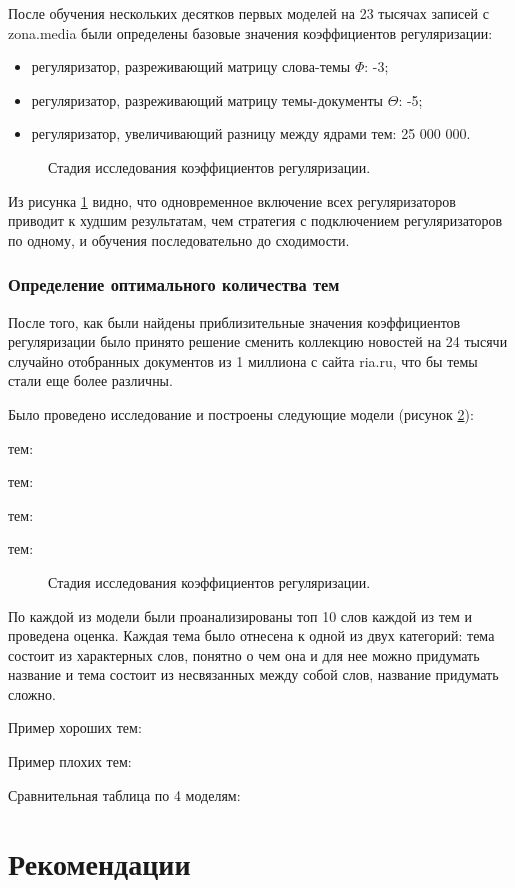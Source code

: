 После обучения нескольких десятков первых моделей на 23 тысячах записей с zona.media были определены базовые значения коэффициентов регуляризации:

\begin{itemize}
    \item регуляризатор, разреживающий матрицу слова-темы $\Phi$: -3;
    \item регуляризатор, разреживающий матрицу темы-документы $\Theta$: -5;
    \item регуляризатор, увеличивающий разницу между ядрами тем: 25 000 000.
\end{itemize}

\begin{figure}[h]
    \caption{Стадия исследования коэффициентов регуляризации.}
    \label{fig:res_table_1}
\end{figure}

Из \todo{}рисунка \ref{fig:res_table_1} видно, что одновременное включение всех регуляризаторов приводит к худшим результатам, чем стратегия с подключением регуляризаторов по одному, и обучения последовательно до сходимости.
\subsubsection{Определение оптимального количества тем}

После того, как были найдены приблизительные значения коэффициентов регуляризации было принято решение сменить коллекцию новостей на 24 тысячи случайно отобранных документов из 1 миллиона с сайта ria.ru, что бы темы стали еще более различны.

Было проведено исследование и построены следующие модели (рисунок \ref{fig:res_table_2}):

 тем:

 тем:

 тем:

 тем:

\begin{figure}[h]
    \caption{Стадия исследования коэффициентов регуляризации.}
    \label{fig:res_table_2}
\end{figure}

По каждой из модели были проанализированы топ 10 слов каждой из тем и проведена оценка. Каждая тема было отнесена к одной из двух категорий: тема состоит из характерных слов, понятно о чем она и для нее можно придумать название и тема состоит из несвязанных между собой слов, название придумать сложно.

Пример хороших тем:

Пример плохих тем:

Сравнительная таблица по 4 моделям:

%
\section{Рекомендации}

\todo[inline]{}